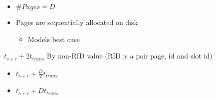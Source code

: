 \begin{itemize}
\begin{itemize}
\begin{itemize}
\begin{itemize}
\begin{itemize}
                                    \item $\#Pages = D$
                                    \item Pages are sequentially allocated on disk
                                        \begin{itemize}
                                            \item Models best case
                                        \end{itemize}
                                \end{itemize}
                             $t_{s+r} + 2t_{trans}$
                             By non-RID value (RID is a pair page, id and slot id)
                                \begin{itemize}
                                    \item $t_{s+r} + \frac{D}{2}t_{trans}$
                                \end{itemize}
                                \begin{itemize}
                                    \item $t_{s+r} + Dt_{trans}$
                                \end{itemize}
                        \end{itemize}
                    \end{itemize}
        \end{itemize}
\end{itemize}

